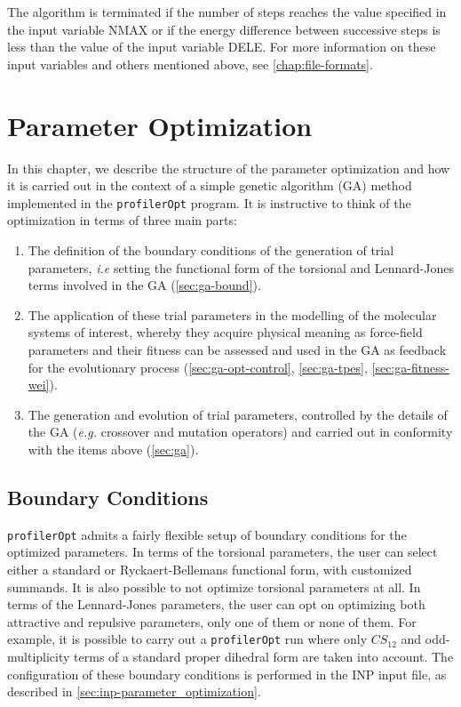 \documentclass[10pt,a4paper,openany]{memoir}
\numberwithin{equation}{section}
\newcommand{\profileropt}[0]{\texttt{profilerOpt}}
\begin{document}
The algorithm is terminated if the number of steps reaches the value specified in the input variable NMAX or if the energy difference between successive steps is less than the value of the input variable DELE.
For more information on these input variables and others mentioned above, see \autoref{chap:file-formats}.

\chapter{Parameter Optimization}
\label{chap:ga}

In this chapter, we describe the structure of the parameter
optimization and how it is carried out in the context of a simple
genetic algorithm (GA) method implemented in the \profileropt{}
program. It is instructive to think of the optimization in terms of
three main parts:
\begin{enumerate}
\item The definition of the boundary conditions of the generation of
  trial parameters, \textit{i.e} setting the functional form of the
  torsional and Lennard-Jones terms involved in the GA
  (\autoref{sec:ga-bound}).

\item The application of these trial parameters in the modelling of
  the molecular systems of interest, whereby they acquire physical
  meaning as force-field parameters and their fitness can be assessed
  and used in the GA as feedback for the evolutionary process
  (\autoref{sec:ga-opt-control}, \autoref{sec:ga-tpes},
  \autoref{sec:ga-fitness-wei}).
  
\item The generation and evolution of trial parameters, controlled by
  the details of the GA (\textit{e.g.} crossover and mutation operators)
  and carried out in conformity with the items above
  (\autoref{sec:ga}).
\end{enumerate}

\section{Boundary Conditions}
\label{sec:ga-bound}

\profileropt{} admits a fairly flexible setup of boundary conditions
for the optimized parameters. In terms of the torsional parameters,
the user can select either a standard or Ryckaert-Bellemans functional
form, with customized summands. It is also possible to not optimize
torsional parameters at all. In terms of the Lennard-Jones parameters,
the user can opt on optimizing both attractive and repulsive
parameters, only one of them or none of them. For example, it is
possible to carry out a \profileropt{} run where only $CS_{12}$ and
odd-multiplicity terms of a standard proper dihedral form are taken
into account. The configuration of these boundary conditions is
performed in the INP input file, as described in
\autoref{sec:inp-parameter_optimization}.
\end{document}
